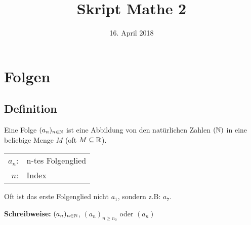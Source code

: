 \documentclass[10pt,a4paper]{article}
\begin{document}
    \title{Skript Mathe 2}
    \date{16. April 2018}
    \maketitle
\fi

    \section{Folgen}
    \subsection{Definition}
    Eine Folge $(a_n)_{n \in \mathbb{N}}$ ist eine Abbildung von den natürlichen Zahlen
    $(\mathbb{N})$ in eine beliebige Menge $M$ (oft $M \subseteq \mathbb{R}$).

    \begin{tabular}{rl}
        $a_n$:& n-tes Folgenglied \\
        $n$:& Index
    \end{tabular}

    Oft ist das erste Folgenglied nicht $a_1$, sondern z.B: $a_7$.
    
    \textbf{Schreibweise:} $(a_n)_{n \in \mathbb{N}}$, $(a_n)_{n \geq n_0}$ oder $(a_n)$
\end{document}
